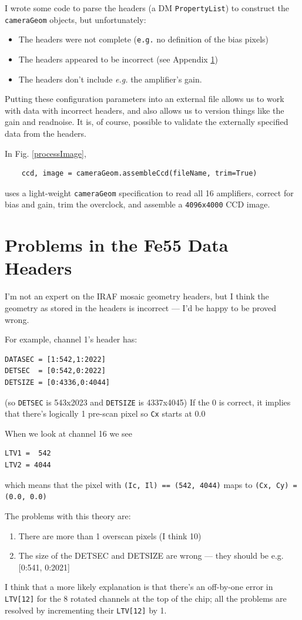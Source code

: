 \documentclass[12pt]{article}
\begin{document}
I wrote some code to parse the headers (a DM \texttt{PropertyList}) to construct the \texttt{cameraGeom}
objects, but unfortunately:
\begin{itemize}
  \item The headers were not complete (\texttt{e.g.} no definition of the bias pixels)
  \item The headers appeared to be incorrect (see Appendix \ref{badHeader})
  \item The headers don't include \textit{e.g.} the amplifier's gain.
\end{itemize}

Putting these configuration parameters into an external file allows us to work with data with incorrect
headers, and also allows us to version things like the gain and readnoise.  It is, of course, possible
to validate the externally specified data from the headers.

In Fig. \ref{processImage},
\begin{lstlisting}
    ccd, image = cameraGeom.assembleCcd(fileName, trim=True)
\end{lstlisting}
uses a light-weight \texttt{cameraGeom} specification to read all 16 amplifiers, correct for bias
and gain, trim the overclock, and assemble a \texttt{4096x4000} CCD image.

\appendix
\section{Problems in the Fe55 Data Headers}
\label{badHeader}

I'm not an expert on the IRAF mosaic geometry headers, but I think the geometry
as stored in the headers is incorrect --- I'd be happy to be proved wrong.

For example, channel 1's header has:
\begin{verbatim}
DATASEC = [1:542,1:2022]
DETSEC  = [0:542,0:2022]
DETSIZE = [0:4336,0:4044]
\end{verbatim}
(so \texttt{DETSEC} is  543x2023 and \texttt{DETSIZE} is 4337x4045)
If the 0 is correct, it implies that there's logically 1 pre-scan pixel so \texttt{Cx} starts at 0.0

When we look at channel 16 we see
\begin{verbatim}
LTV1 =  542
LTV2 = 4044
\end{verbatim}
which means that the pixel with \texttt{(Ic, Il) == (542, 4044)} maps to \texttt{(Cx, Cy) = (0.0, 0.0)}

The problems with this theory are:
\begin{enumerate}
\item There are more than 1 overscan pixels (I think 10)
\item The size of the DETSEC and DETSIZE are wrong --- they should be e.g. [0:541, 0:2021]
\end{enumerate}

I think that a more likely explanation is that there's an off-by-one error in \texttt{LTV[12]} for the 8
rotated channels at the top of the chip; all the problems are resolved by incrementing their \texttt{LTV[12]}
by 1.
\end{document}
